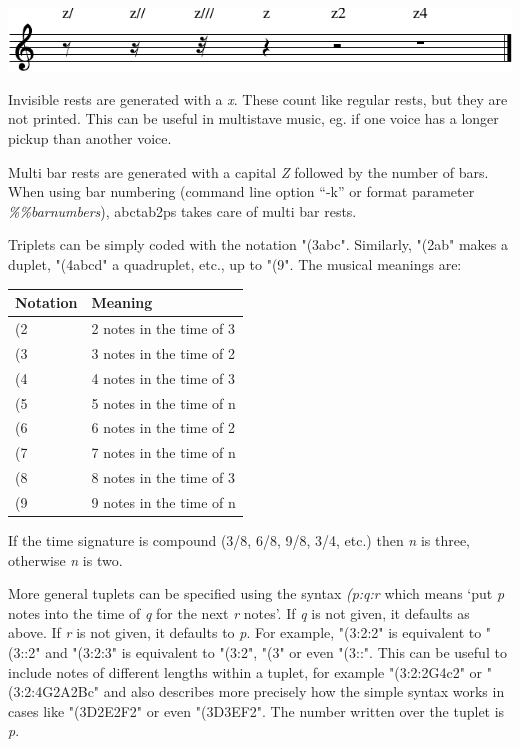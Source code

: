 \documentclass[a4paper]{article}
\begin{document}
\begin{center}
\includegraphics{sample3-edited}
\end{center}

Invisible rests are generated with a {\it x}. These count like regular 
rests, but they are not printed. This can be useful in multistave 
music, eg. if one voice has a longer pickup than another voice.
\par
{}
Multi bar rests are generated with a capital {\it Z} followed by the
number of bars. When using bar numbering (command line option ``-k'' or
format parameter {\it \%\%barnumbers}), abctab2ps takes care of multi bar
rests.

\par
{} Triplets can be simply coded with the notation "(3abc".
Similarly, "(2ab" makes a duplet, "(4abcd" a quadruplet, etc., 
up to "(9". The musical meanings are:
\begin{center}
\begin{tabular}{|l|l|} \hline
Notation & Meaning \\ \hline
 (2 & 2 notes in the time of 3 \\ \hline
 (3 & 3 notes in the time of 2 \\ \hline
 (4 & 4 notes in the time of 3 \\ \hline
 (5 & 5 notes in the time of n \\ \hline
 (6 & 6 notes in the time of 2 \\ \hline
 (7 & 7 notes in the time of n \\ \hline
 (8 & 8 notes in the time of 3 \\ \hline
 (9 & 9 notes in the time of n \\ \hline
\end{tabular}
\end{center}
If the time signature is compound (3/8, 6/8, 9/8, 3/4, etc.) then
{\it n} is three, otherwise {\it n} is two.

More general tuplets can be specified using the syntax {\it (p:q:r}
which  means `put {\it p} notes into the time of {\it q} for the next {\it r}
notes'. If {\it q}  is not given, it defaults as above. If {\it r} is not
given,  it  defaults  to {\it p}.  For example, "(3:2:2" is equivalent to
"(3::2" and "(3:2:3" is equivalent to "(3:2", "(3" or even 
"(3::". This
can  be  useful  to  include  notes of different lengths within a
tuplet, for example "(3:2:2G4c2" or "(3:2:4G2A2Bc" and also describes
more precisely how the simple syntax works in cases like "(3D2E2F2"
or even "(3D3EF2". The number written over the tuplet is {\it p}.
\end{document}
